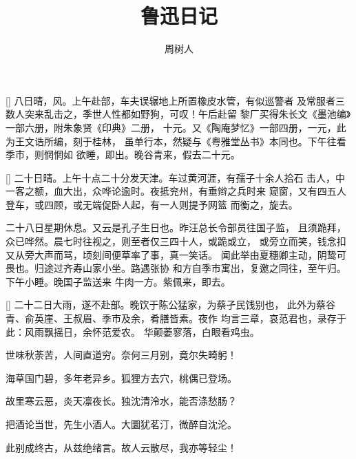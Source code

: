 \documentclass{diary}
\author{周树人}
\title{鲁迅日记}
\begin{document}
\maketitle


%
[\windy]%
八日晴，风。上午赴部，车夫误辗地上所置橡皮水管，有似巡警者
及常服者三数人突来乱击之，季世人性都如野狗，可叹！午后赴留
黎厂买得朱长文《墨池编》一部六册，附朱象贤《印典》二册，
十元。又《陶庵梦忆》一部四册，一元，此为王文诰所编，刻于桂林，
虽单行本，然疑与《粤雅堂丛书》本同也。下午往看季市，则惘惘如
欲睡，即出。晚谷青来，假去二十元。

%

[\sunny]%
二十日晴。上午十点二十分发天津。车过黄河涯，有孺子十余人拾石
击人，中一客之额，血大出，众哗论逾时。夜抵兖州，有垂辫之兵时来
窥窗，又有四五人登车，或四顾，或无端促卧人起，有一人则提予网篮
而衡之，旋去。

%

%
二十八日星期休息。又云是孔子生日也。昨汪总长令部员往国子监，
且须跪拜，众已哗然。晨七时往视之，则至者仅三四十人，或跪或立，
或旁立而笑，钱念扣又从旁大声而骂，顷刻间便草率了事，真一笑话。
闻此举由夏穗卿主动，阴鸷可畏也。归途过齐寿山家小坐。路遇张协
和方自季市寓出，复邀之同往，至午归。下午小睡。晚国子监送来
牛肉一方。紫佩来，即去。

[\rainy]%
二十二日大雨，遂不赴部。晚饮于陈公猛家，为蔡孑民饯别也，
此外为蔡谷青、俞英崖、王叔眉、季市及余，肴膳皆素。夜作
均言三章，哀范君也，录存于此：风雨飘摇日，余怀范爱农。
华颠萎寥落，白眼看鸡虫。

世味秋荼苦，人间直道穷。奈何三月别，竟尔失畸躬！

海草国门碧，多年老异乡。狐狸方去穴，桃偶已登场。

故里寒云恶，炎天凛夜长。独沈清泠水，能否涤愁肠？

把酒论当世，先生小酒人。大圜犹茗汀，微醉自沈沦。

此别成终古，从兹绝绪言。故人云散尽，我亦等轻尘！
\end{document}
